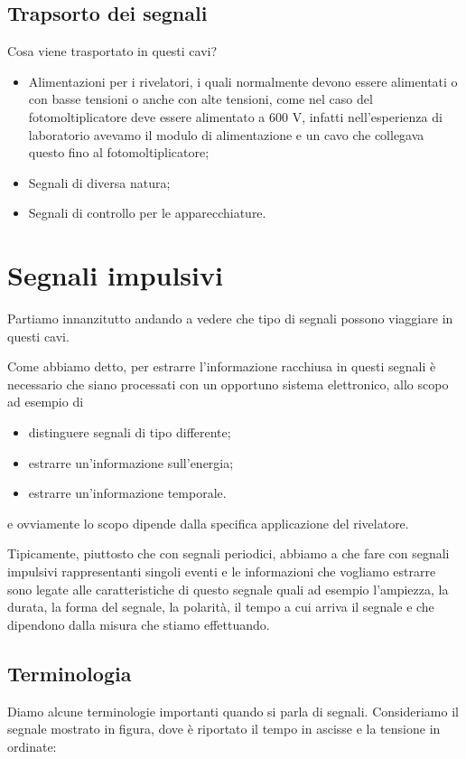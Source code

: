 \subsection{Trapsorto dei segnali}

Cosa viene trasportato in questi cavi?

\begin{itemize}[leftmargin=0.5cm]
   \item Alimentazioni per i rivelatori, i quali normalmente devono essere alimentati o con basse tensioni o anche con alte tensioni, come nel caso del fotomoltiplicatore deve essere alimentato a 600 V, infatti nell'esperienza di laboratorio avevamo il modulo di alimentazione e un cavo che collegava questo fino al fotomoltiplicatore;
   \item Segnali di diversa natura;
   \item Segnali di controllo per le apparecchiature.
\end{itemize}

\section{Segnali impulsivi}
Partiamo innanzitutto andando a vedere che tipo di segnali possono viaggiare in questi cavi.

Come abbiamo detto, per estrarre l'informazione racchiusa in questi segnali è necessario che siano processati con un opportuno sistema elettronico, allo scopo ad esempio di
\begin{itemize}[leftmargin=0.5cm]
   \item distinguere segnali di tipo differente;
   \item estrarre un'informazione sull'energia;
   \item estrarre un'informazione temporale.
\end{itemize}
e ovviamente lo scopo dipende dalla specifica applicazione del rivelatore.

Tipicamente, piuttosto che con segnali periodici, abbiamo a che fare con segnali impulsivi rappresentanti singoli eventi e le informazioni che vogliamo estrarre sono legate alle caratteristiche di questo segnale quali ad esempio l'ampiezza, la durata, la forma del segnale, la polarità, il tempo a cui arriva il segnale e che dipendono dalla misura che stiamo effettuando.

\subsection{Terminologia}
Diamo alcune terminologie importanti quando si parla di segnali. Consideriamo il segnale mostrato in figura, dove è riportato il tempo in ascisse e la tensione in ordinate:

